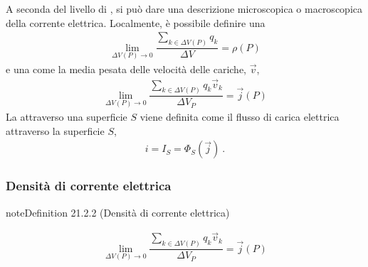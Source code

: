 \documentclass[letterpaper,10pt,italian]{jupyterBook}
\begin{document}
\sphinxAtStartPar
A seconda del livello di {\hyperref[\detokenize{ch/intro/current-status:physics-hs-intro-current-status-micro-macro}]{}}, si può dare una descrizione microscopica o macroscopica della corrente elettrica. Localmente, è possibile definire una 
\begin{equation*}
\begin{split}\lim_{\Delta V(P) \rightarrow 0} \dfrac{\sum_{k \in \Delta V(P)} q_k}{\Delta V} = \rho(P)\end{split}
\end{equation*}
\sphinxAtStartPar
e una  come la media pesata delle velocità delle cariche, \(\vec{v}\),
\begin{equation*}
\begin{split}\lim_{\Delta V(P) \rightarrow 0} \dfrac{\sum_{k \in \Delta V(P)} q_k \vec{v}_k}{\Delta V_P} = \vec{j}(P)\end{split}
\end{equation*}
\sphinxAtStartPar
La  attraverso una superficie \(S\) viene definita come il flusso di carica elettrica attraverso la superficie \(S\),
\begin{equation*}
\begin{split}i = I_{S} = \Phi_{S}(\vec{j}) \ .\end{split}
\end{equation*}

\subsubsection{Densità di corrente elettrica}
\label{\detokenize{ch/electromagnetism/electric-current:densita-di-corrente-elettrica}}\label{\detokenize{ch/electromagnetism/electric-current:electric-current-density-def}}\label{ch/electromagnetism/electric-current:electric-current-density}
\begin{sphinxadmonition}{note}{Definition 21.2.2 (Densità di corrente elettrica)}


\begin{equation*}
\begin{split}\lim_{\Delta V(P) \rightarrow 0} \dfrac{\sum_{k \in \Delta V(P)} q_k \vec{v}_k}{\Delta V_P} = \vec{j}(P)\end{split}
\end{equation*}\end{sphinxadmonition}
\end{document}
